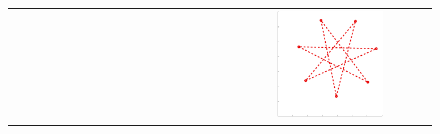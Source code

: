 \documentclass[11pt,a4paper]{book}
\newcommand{\wToy}{0.288}
\begin{document}
\begin{figure}[h!]
\begin{tabular}{rccc}
    \includegraphics[width=\wToy\textwidth]{img-sgd/toy.9.l} \\


\end{tabular}
\end{figure}
\end{document}
